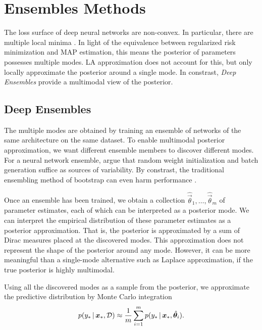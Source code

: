 \section{Ensembles Methods}
\label{sec:de}

The loss surface of deep neural networks are non-convex. In particular, there are multiple local minima \cite{liVisualizingLossLandscape2018}. In light of the equivalence between regularized risk minimization and MAP estimation, this means the posterior of parameters possesses multiple modes. LA approximation does not account for this, but only locally approximate the posterior around a single mode. In constrast, \emph{Deep Ensembles} \citep{lakshminarayananSimpleScalablePredictive2017b} provide a multimodal view of the posterior.

\subsection{Deep Ensembles}

The multiple modes are obtained by training an ensemble of networks of the same architecture on the same dataset. To enable multimodal posterior approximation, we want different ensemble members to discover different modes. For a neural network ensemble, \cite{lakshminarayananSimpleScalablePredictive2017b} argue that random weight initialization and batch generation suffice as sources of  variability. By constrast, the traditional ensembling method of bootstrap can even harm performance \citep{livierisEnsembleTechniquesWeightconstrained2021}.

Once an ensemble has been trained, we obtain a collection $\hat{\vec{\theta}}_1, \dots, \hat{\vec{\theta}}_m$ of parameter estimates, each of which can be interpreted as a posterior mode. We can interpret the empirical distribution of these parameter estimates as a posterior approximation. That is, the posterior is approximated by a sum of Dirac measures placed at the discovered modes. This approximation does not represent the shape of the posterior around any mode. However, it can be more meaningful than a single-mode alternative such as Laplace approximation, if the true posterior is highly multimodal.

Using all the discovered modes as a sample from the posterior, we approximate the predictive distribution by Monte Carlo integration
\begin{equation} \label{eq:ensemble}
  p(y_* \,|\, \bm{x}_*, \mathcal{D}) \approx \frac{1}{m} \sum_{i=1}^{m} p(y_* \,|\, \bm{x}_*, \hat{\bm{\theta}}_i).
\end{equation}

